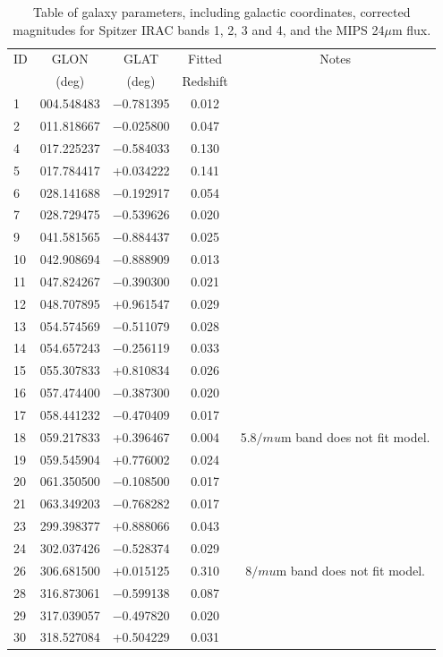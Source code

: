 \documentclass[times,usenatbib]{mn2e}
\begin{document}
\begin{table}
\begin{center}
\caption{Table of galaxy parameters, including galactic coordinates, corrected magnitudes for Spitzer IRAC bands 1, 2, 3 and 4, and the MIPS 24$\mu$m flux.}
\begin{tabular}{lcccc}
\hline
ID & GLON & GLAT & Fitted & Notes \\
 & (deg) & (deg) & Redshift & \\
\hline
 1 & 004.548483 & $-$0.781395 & 0.012 & \\
 2 & 011.818667 & $-$0.025800 & 0.047 & \\
 4 & 017.225237 & $-$0.584033 & 0.130 & \\
 5 & 017.784417 &   +0.034222 & 0.141 & \\
 6 & 028.141688 & $-$0.192917 & 0.054 & \\
 7 & 028.729475 & $-$0.539626 & 0.020 & \\
 9 & 041.581565 & $-$0.884437 & 0.025 & \\
10 & 042.908694 & $-$0.888909 & 0.013 & \\
11 & 047.824267 & $-$0.390300 & 0.021 & \\
12 & 048.707895 &   +0.961547 & 0.029 & \\
13 & 054.574569 & $-$0.511079 & 0.028 & \\
14 & 054.657243 & $-$0.256119 & 0.033 & \\
15 & 055.307833 &   +0.810834 & 0.026 & \\
16 & 057.474400 & $-$0.387300 & 0.020 & \\
17 & 058.441232 & $-$0.470409 & 0.017 & \\
18 & 059.217833 &   +0.396467 & 0.004 & 5.8$/mu$m band does not fit model. \\
19 & 059.545904 &   +0.776002 & 0.024 & \\
20 & 061.350500 & $-$0.108500 & 0.017 & \\
21 & 063.349203 & $-$0.768282 & 0.017 & \\
23 & 299.398377 &   +0.888066 & 0.043 & \\
24 & 302.037426 & $-$0.528374 & 0.029 & \\
26 & 306.681500 &   +0.015125 & 0.310 & 8$/mu$m band does not fit model. \\
28 & 316.873061 & $-$0.599138 & 0.087 & \\
29 & 317.039057 & $-$0.497820 & 0.020 & \\
30 & 318.527084 &   +0.504229 & 0.031 & \\

\end{tabular}
\end{center}
\end{table}
\end{document}
